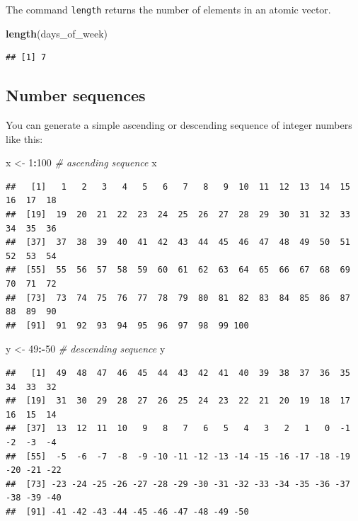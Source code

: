 \documentclass[
]{scrartcl}
\newenvironment{Shaded}{\begin{snugshade}}{\end{snugshade}}
\newcommand{\CommentTok}[1]{\textcolor[rgb]{0.56,0.35,0.01}{\textit{#1}}}
\newcommand{\DecValTok}[1]{\textcolor[rgb]{0.00,0.00,0.81}{#1}}
\newcommand{\KeywordTok}[1]{\textcolor[rgb]{0.13,0.29,0.53}{\textbf{#1}}}
\newcommand{\NormalTok}[1]{#1}
\newcommand{\OperatorTok}[1]{\textcolor[rgb]{0.81,0.36,0.00}{\textbf{#1}}}
\newcommand{\StringTok}[1]{\textcolor[rgb]{0.31,0.60,0.02}{#1}}
\begin{document}
The command \texttt{length} returns the number of elements in an atomic vector.

\begin{Shaded}
\begin{Highlighting}[]
\KeywordTok{length}\NormalTok{(days\_of\_week)}
\end{Highlighting}
\end{Shaded}

\begin{verbatim}
## [1] 7
\end{verbatim}

\hypertarget{number-sequences}{%
\subsection{Number sequences}\label{number-sequences}}

You can generate a simple ascending or descending sequence of integer numbers like this:

\begin{Shaded}
\begin{Highlighting}[]
\NormalTok{x \textless{}{-}}\StringTok{ }\DecValTok{1}\OperatorTok{:}\DecValTok{100}   \CommentTok{\# ascending sequence}
\NormalTok{x}
\end{Highlighting}
\end{Shaded}

\begin{verbatim}
##   [1]   1   2   3   4   5   6   7   8   9  10  11  12  13  14  15  16  17  18
##  [19]  19  20  21  22  23  24  25  26  27  28  29  30  31  32  33  34  35  36
##  [37]  37  38  39  40  41  42  43  44  45  46  47  48  49  50  51  52  53  54
##  [55]  55  56  57  58  59  60  61  62  63  64  65  66  67  68  69  70  71  72
##  [73]  73  74  75  76  77  78  79  80  81  82  83  84  85  86  87  88  89  90
##  [91]  91  92  93  94  95  96  97  98  99 100
\end{verbatim}

\begin{Shaded}
\begin{Highlighting}[]
\NormalTok{y \textless{}{-}}\StringTok{ }\DecValTok{49}\OperatorTok{:{-}}\DecValTok{50}  \CommentTok{\# descending sequence}
\NormalTok{y}
\end{Highlighting}
\end{Shaded}

\begin{verbatim}
##   [1]  49  48  47  46  45  44  43  42  41  40  39  38  37  36  35  34  33  32
##  [19]  31  30  29  28  27  26  25  24  23  22  21  20  19  18  17  16  15  14
##  [37]  13  12  11  10   9   8   7   6   5   4   3   2   1   0  -1  -2  -3  -4
##  [55]  -5  -6  -7  -8  -9 -10 -11 -12 -13 -14 -15 -16 -17 -18 -19 -20 -21 -22
##  [73] -23 -24 -25 -26 -27 -28 -29 -30 -31 -32 -33 -34 -35 -36 -37 -38 -39 -40
##  [91] -41 -42 -43 -44 -45 -46 -47 -48 -49 -50
\end{verbatim}
\end{document}
